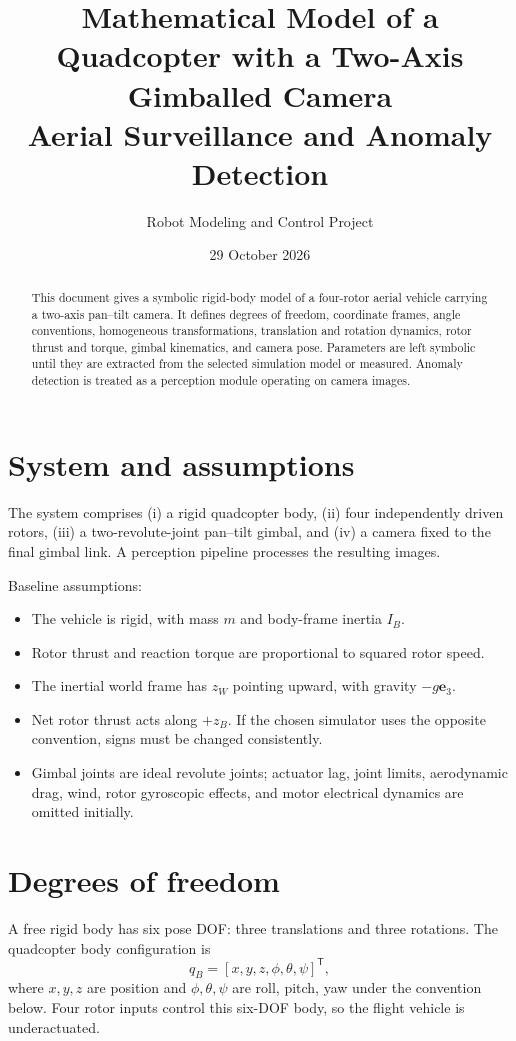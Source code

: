 \documentclass[11pt,a4paper]{article}
\title{\textbf{Mathematical Model of a Quadcopter with a Two-Axis Gimballed Camera}\\
\large Aerial Surveillance and Anomaly Detection}
\author{Robot Modeling and Control Project}
\date{29 October 2026}
\begin{document}
\maketitle
\begin{abstract}
This document gives a symbolic rigid-body model of a four-rotor aerial vehicle carrying a two-axis pan--tilt camera. It defines degrees of freedom, coordinate frames, angle conventions, homogeneous transformations, translation and rotation dynamics, rotor thrust and torque, gimbal kinematics, and camera pose. Parameters are left symbolic until they are extracted from the selected simulation model or measured. Anomaly detection is treated as a perception module operating on camera images.
\end{abstract}
\tableofcontents
\newpage

\section{System and assumptions}
The system comprises (i) a rigid quadcopter body, (ii) four independently driven rotors, (iii) a two-revolute-joint pan--tilt gimbal, and (iv) a camera fixed to the final gimbal link. A perception pipeline processes the resulting images.

Baseline assumptions:
\begin{itemize}[leftmargin=1.4em]
\item The vehicle is rigid, with mass \(m\) and body-frame inertia \(I_B\).
\item Rotor thrust and reaction torque are proportional to squared rotor speed.
\item The inertial world frame has \(z_W\) pointing upward, with gravity \(-g\mathbf e_3\).
\item Net rotor thrust acts along \(+z_B\). If the chosen simulator uses the opposite convention, signs must be changed consistently.
\item Gimbal joints are ideal revolute joints; actuator lag, joint limits, aerodynamic drag, wind, rotor gyroscopic effects, and motor electrical dynamics are omitted initially.
\end{itemize}

\section{Degrees of freedom}
A free rigid body has six pose DOF: three translations and three rotations. The quadcopter body configuration is
\[
q_B=[x,y,z,\phi,\theta,\psi]^{\mathsf T},
\]
where \(x,y,z\) are position and \(\phi,\theta,\psi\) are roll, pitch, yaw under the convention below. Four rotor inputs control this six-DOF body, so the flight vehicle is underactuated.
\end{document}
